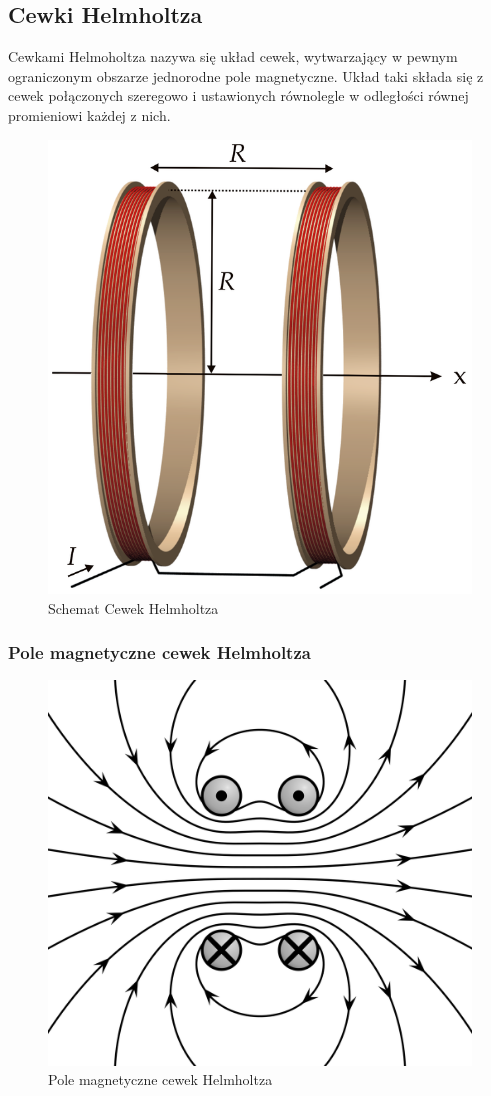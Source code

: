 \documentclass[paper=a4, fontsize=12pt]{scrartcl}
\begin{document}
\subsection{Cewki Helmholtza}
Cewkami Helmoholtza nazywa się układ cewek, wytwarzający w pewnym ograniczonym obszarze jednorodne pole magnetyczne.  Układ taki składa się z cewek połączonych szeregowo i ustawionych równolegle w odległości równej promieniowi każdej z nich.

\begin{figure}[h!]
\centering
\includegraphics[width=0.3\linewidth]{ch}
\caption{Schemat Cewek Helmholtza}
\label{fig:ch}
\end{figure}

\subsubsection{Pole magnetyczne cewek Helmholtza}
\begin{figure}[h!]
\centering
\includegraphics[width=0.3\linewidth]{chp}
\caption{Pole magnetyczne cewek Helmholtza}
\label{fig:chp}
\end{figure}
\end{document}
